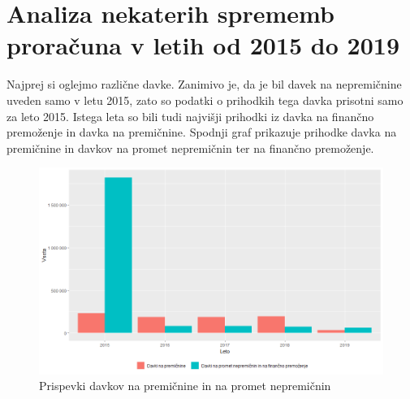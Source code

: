 \documentclass[12pt, a4paper]{article}
\begin{document}
\newpage
\section[Analiza nekaterih sprememb proračuna v letih od 2015 do 2019]{Analiza nekaterih sprememb proračuna v letih od 2015 do 2019}

\hspace*{5mm} Najprej si oglejmo različne davke. Zanimivo je, da je bil davek na nepremičnine uveden samo v letu 2015, zato so podatki o prihodkih tega davka prisotni samo za leto 2015. Istega leta so bili tudi najvišji prihodki iz davka na finančno premoženje in davka na premičnine. Spodnji graf prikazuje prihodke davka na premičnine in davkov na promet nepremičnin ter na finančno premoženje.
\begin{figure}[h!]
\centering
\includegraphics[width = 14 cm]{davki_na_premozenje_graf.png}
\caption{Prispevki davkov na premičnine in na promet nepremičnin}
\label{Slika 1}
\end{figure}
\end{document}
